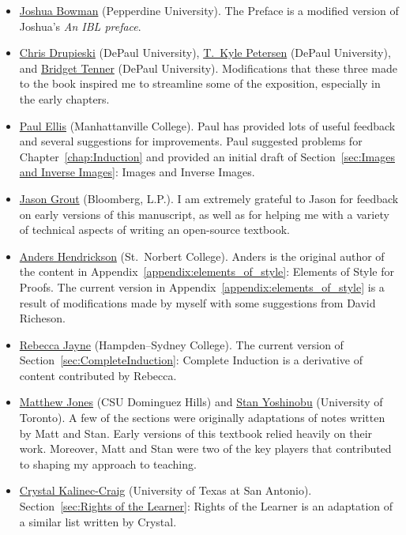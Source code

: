 \begin{itemize}
\item \href{https://thalestriangles.blogspot.com}{Joshua Bowman} (Pepperdine University). The Preface is a modified version of Joshua's \emph{An IBL preface}.
\item \href{https://math.depaul.edu/cdrupies/}{Chris Drupieski} (DePaul University), \href{http://math.depaul.edu/tpeter21/}{T.~Kyle Petersen} (DePaul University), and \href{http://math.depaul.edu/bridget/}{Bridget Tenner} (DePaul University). Modifications that these three made to the book inspired me to streamline some of the exposition, especially in the early chapters.
\item \href{http://www.paulellis.org}{Paul Ellis} (Manhattanville College). Paul has provided lots of useful feedback and several suggestions for improvements. Paul suggested problems for Chapter~\ref{chap:Induction} and provided an initial draft of Section~\ref{sec:Images and Inverse Images}: Images and Inverse Images.
\item \href{http://jasongrout.org}{Jason Grout} (Bloomberg, L.P.).  I am extremely grateful to Jason for feedback on early versions of this manuscript, as well as for helping me with a variety of technical aspects of writing an open-source textbook.
\item \href{http://home.snc.edu/andershendrickson/}{Anders Hendrickson} (St.~Norbert College). Anders is the original author of the content in Appendix~\ref{appendix:elements_of_style}: Elements of Style for Proofs. The current version in Appendix~\ref{appendix:elements_of_style} is a result of modifications made by myself with some suggestions from David Richeson.
\item \href{http://www.hsc.edu/rebecca-jayne}{Rebecca Jayne} (Hampden--Sydney College). The current version of Section~\ref{sec:CompleteInduction}: Complete Induction is a derivative of content contributed by Rebecca.
\item \href{http://www4.csudh.edu/library/info/civic-directory/f-j/matthew-g-jones}{Matthew Jones} (CSU Dominguez Hills) and \href{http://www.stanyoshinobu.com}{Stan Yoshinobu} (University of Toronto). A few of the sections were originally adaptations of notes written by Matt and Stan. Early versions of this textbook relied heavily on their work. Moreover, Matt and Stan were two of the key players that contributed to shaping my approach to teaching.
\item \href{https://embracinglifewithmajorrevisions.org/2017/07/12/rights-of-the-learner-an-introduction/}{Crystal Kalinec-Craig} (University of Texas at San Antonio). Section~\ref{sec:Rights of the Learner}: Rights of the Learner is an adaptation of a similar list written by Crystal.

\end{itemize}
